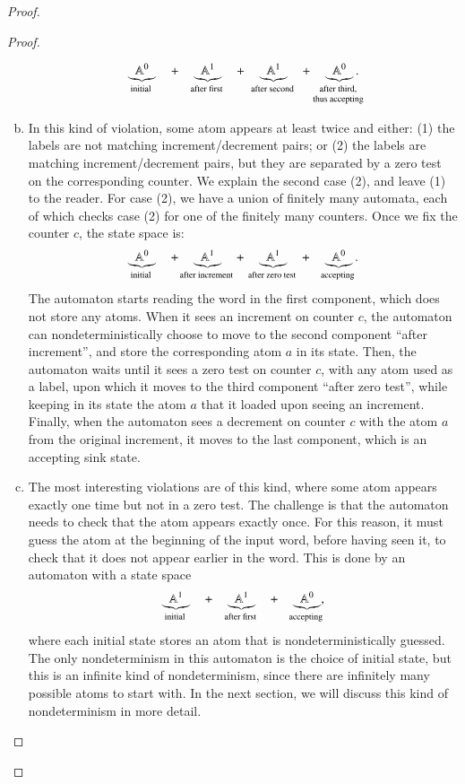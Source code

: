 \begin{proof}
\begin{proof}
\begin{enumerate}[(a)]
   \begin{align*}
        \myunderbrace{\atoms^{0}}{initial} \quad + \quad 
        \myunderbrace{\atoms^{1}}{after first} \quad + \quad
        \myunderbrace{\atoms^{1}}{after second} \quad + \quad
        \myunderbrace{\atoms^{0}}{after third, \\ thus accepting}.
   \end{align*}
   \item  In this kind of violation, some atom appears at least twice and either: (1) the labels are not matching increment/decrement pairs; or (2) the labels are matching increment/decrement pairs, but they are separated by a zero test on the corresponding counter.  We explain the second case (2),  and leave (1) to the reader. For case (2), we have a union of finitely many automata, each of which checks case (2) for one of the finitely many counters.  Once we fix the counter $c$, the state space is:
   \begin{align*}
    \myunderbrace{\atoms^{0}}{initial} \quad + \quad 
    \myunderbrace{\atoms^{1}}{after increment} \quad + \quad
    \myunderbrace{\atoms^{1}}{after zero test} \quad + \quad
    \myunderbrace{\atoms^{0}}{accepting}.
\end{align*}
    The automaton starts reading the word in the first component, which does not store any atoms.   When it sees an increment on counter $c$, the automaton can nondeterministically choose to move to the second component ``after increment'', and store the corresponding atom $a$ in its state.  Then, the automaton waits until it sees a zero test on counter $c$, with any atom used as a label, upon which it moves to the third  component ``after zero test'', while keeping in its state the atom $a$ that it loaded upon seeing an increment.  Finally, when the automaton sees a decrement on counter $c$ with the atom $a$ from the original increment, it moves to the last component, which is an accepting sink state. 
\item     The most interesting violations are of this kind, where some atom appears exactly one time but not in a zero test.  The challenge is that the automaton needs to check that the atom appears exactly once. For this reason, it must guess the atom at the beginning of the input word, before having seen it, to check that it does not appear earlier in the word. This is done by an automaton  with a  state space 
    \begin{align*}
        \myunderbrace{\atoms^{1}}{initial} \quad + \quad 
        \myunderbrace{\atoms^{1}}{after first} \quad + \quad
        \myunderbrace{\atoms^{0}}{accepting},
    \end{align*}
    where each initial state stores an atom that is nondeterministically guessed. The only nondeterminism in this automaton is the choice of initial state, but this is an infinite kind of nondeterminism, since there are infinitely many possible atoms to start with. In the next section, we will discuss this kind of nondeterminism in more detail.
   \end{enumerate}


\end{proof}
\end{proof}
